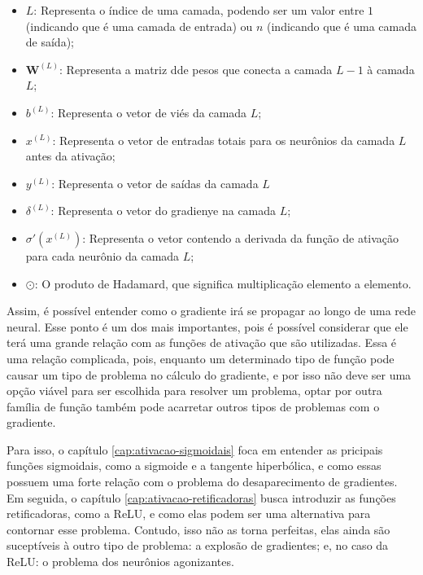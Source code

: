 \begin{itemize}
    \item $L$: Representa o índice de uma camada, podendo ser um valor entre $1$ (indicando que é uma camada de entrada) ou $n$ (indicando que é uma camada de saída);
    \item $\textbf{W}^{(L)}$: Representa a matriz dde pesos que conecta a camada $L - 1$ à camada $L$;
    \item $b^{(L)}$: Representa o vetor de viés da camada $L$;
    \item $x^{(L)}$: Representa o vetor de entradas totais para os neurônios da camada $L$ antes da ativação;
    \item $y^{(L)}$: Representa o vetor de saídas da camada $L$
    \item $\delta^{(L)}$: Representa o vetor do gradienye na camada $L$;
    \item $\sigma'(x^{(L)})$: Representa o vetor contendo a derivada da função de ativação para cada neurônio da camada $L$;
    \item $\odot$: O produto de Hadamard, que significa multiplicação elemento a elemento.
\end{itemize}

Assim, é possível entender como o gradiente irá se propagar ao longo de uma rede neural. Esse ponto é um dos mais importantes, pois é possível considerar que ele terá uma grande relação com as funções de ativação que são utilizadas. Essa é uma relação complicada, pois, enquanto um determinado tipo de função pode causar um tipo de problema no cálculo do gradiente, e por isso não deve ser uma opção viável para ser escolhida para resolver um problema, optar por outra família de função também pode acarretar outros tipos de problemas com o gradiente.

Para isso, o capítulo \ref{cap:ativacao-sigmoidais} foca em entender as pricipais funções sigmoidais, como a sigmoide e a tangente hiperbólica, e como essas possuem uma forte relação com o problema do desaparecimento de gradientes. Em seguida, o capítulo \ref{cap:ativacao-retificadoras} busca introduzir as funções retificadoras, como a ReLU, e como elas podem ser uma alternativa para contornar esse problema. Contudo, isso não as torna perfeitas, elas ainda são suceptíveis à outro tipo de problema: a explosão de gradientes; e, no caso da ReLU: o problema dos neurônios agonizantes.


